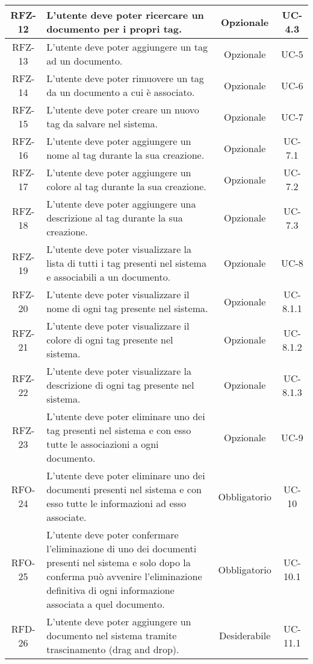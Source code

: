 \begin{xltabular}{\textwidth}{| c | X | c | c |}
    RFZ-12 & L’utente deve poter ricercare un documento per i propri tag. & Opzionale & UC-4.3 \\
    \hline
    RFZ-13 & L’utente deve poter aggiungere un tag ad un documento. & Opzionale & UC-5 \\
    \hline
    RFZ-14 & L’utente deve poter rimuovere un tag da un documento a cui è associato. & Opzionale & UC-6 \\
    \hline
    RFZ-15 & L’utente deve poter creare un nuovo tag da salvare nel sistema. & Opzionale & UC-7 \\
    \hline
    RFZ-16 & L’utente deve poter aggiungere un nome al tag durante la sua creazione. & Opzionale & UC-7.1 \\
    \hline
    RFZ-17 & L’utente deve poter aggiungere un colore al tag durante la sua creazione. & Opzionale & UC-7.2 \\
    \hline
    RFZ-18 & L’utente deve poter aggiungere una descrizione al tag durante la sua creazione. & Opzionale & UC-7.3 \\
    \hline
    RFZ-19 & L’utente deve poter visualizzare la lista di tutti i tag presenti nel sistema e associabili a un documento. & Opzionale & UC-8 \\
    \hline
    RFZ-20 & L’utente deve poter visualizzare il nome di ogni tag presente nel sistema. & Opzionale & UC-8.1.1 \\
    \hline
    RFZ-21 & L’utente deve poter visualizzare il colore di ogni tag presente nel sistema. & Opzionale & UC-8.1.2 \\
    \hline
    RFZ-22 & L’utente deve poter visualizzare la descrizione di ogni tag presente nel sistema. & Opzionale & UC-8.1.3 \\
    \hline
    RFZ-23 & L’utente deve poter eliminare uno dei tag presenti nel sistema e con esso tutte le associazioni a ogni documento. & Opzionale & UC-9 \\
    \hline
    RFO-24 & L’utente deve poter eliminare uno dei documenti presenti nel sistema e con esso tutte le informazioni ad esso associate. & Obbligatorio & UC-10 \\
    \hline
    RFO-25 & L’utente deve poter confermare l’eliminazione di uno dei documenti presenti nel sistema e solo dopo la conferma può avvenire l'eliminazione definitiva di ogni informazione associata a quel documento. & Obbligatorio & UC-10.1 \\
    \hline
    RFD-26 & L’utente deve poter aggiungere un documento nel sistema tramite trascinamento (drag and drop). & Desiderabile & UC-11.1 \\

\end{xltabular}
